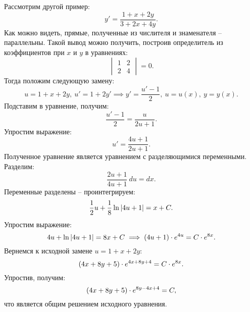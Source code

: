 		Рассмотрим другой пример:
		\[ y' = \frac{1 + x + 2y}{3 + 2x + 4y}. \]
		Как можно видеть, прямые, полученные из числителя и знаменателя -- параллельны. Такой вывод можно получить, построив определитель из коэффициентов при $x$ и $y$ в уравнениях:
		\[ \begin{vmatrix} 1 & 2 \\ 2 & 4 \end{vmatrix} = 0. \]
		Тогда положим следующую замену:
		\[ u = 1 + x + 2y, ~ u' = 1 + 2y' \implies y' = \frac{u' - 1}{2}, ~ u = u(x), ~ y = y(x). \]
		Подставим в уравнение, получим:
		\[ \frac{u' - 1}{2} = \frac{u}{2u + 1}. \]
		Упростим выражение:
		\[ u' = \frac{4u + 1}{2u + 1}. \]
		Полученное уравнение является уравнением с разделяющимися переменными. Разделим:
		\[ \frac{2u + 1}{4u + 1} ~ du = dx. \]
		Переменные разделены -- проинтегрируем:
		\[ \frac{1}{2} u + \frac{1}{8} \ln \left\vert 4u + 1 \right\vert = x + C. \]
		Упростим выражение:
		\[ 4u + \ln\left\vert 4u + 1 \right\vert = 8x + C \implies \left( 4u + 1 \right) \cdot e^{4u} = C \cdot e^{8x}. \]
		Вернемся к исходной замене $u = 1 + x + 2y$:
		\[ \left( 4x + 8y + 5 \right) \cdot e^{4x + 8y + 4} = C \cdot e^{8x}. \]
		Упростив, получим:
		\[ \left( 4x + 8y + 5 \right) \cdot e^{8y - 4x + 4} = C, \]
		что является общим решением исходного уравнения.

